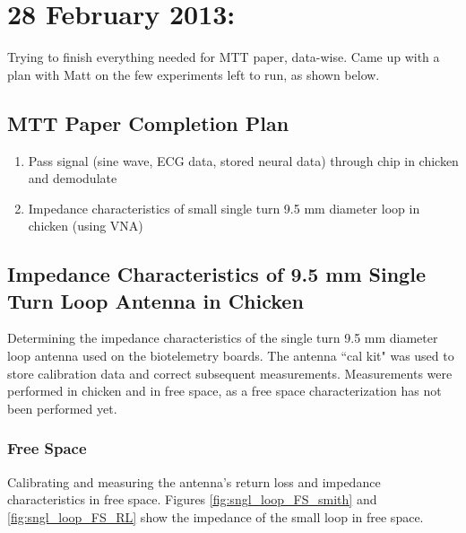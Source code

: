 \documentclass[12pt,onecolumn,titlepage]{article}
\begin{document}
\clearpage
\section{28 February 2013:}

\indent \indent Trying to finish everything needed for MTT paper, data-wise. Came up with a plan with Matt on the few experiments left to run, as shown below.

\subsection{MTT Paper Completion Plan}

\begin{enumerate}
\item Pass signal (sine wave, ECG data, stored neural data) through chip in chicken and demodulate
\item Impedance characteristics of small single turn 9.5 mm diameter loop in chicken (using VNA)
\end{enumerate}


\subsection{Impedance Characteristics of 9.5 mm Single Turn Loop Antenna in Chicken}
\indent \indent Determining the impedance characteristics of the single turn 9.5 mm diameter loop antenna used on the biotelemetry boards. The antenna ``cal kit" was used to store calibration data and correct subsequent measurements. Measurements were performed in chicken and in free space, as a free space characterization has not been performed yet.

\subsubsection{Free Space}
\indent \indent Calibrating and measuring the antenna's return loss and impedance characteristics in free space. Figures \ref{fig:sngl_loop_FS_smith} and \ref{fig:sngl_loop_FS_RL} show the impedance of the small loop in free space.
\end{document}
